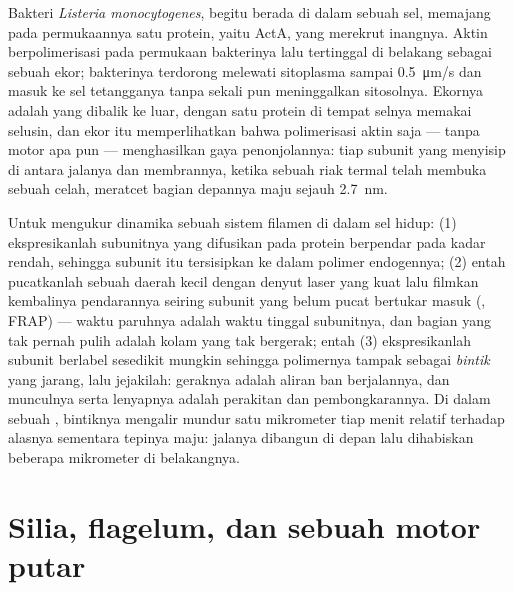\begin{example}\label{ex:b3:cytoskeleton-motility:listeria}
Bakteri \emph{Listeria monocytogenes}, begitu berada di dalam sebuah sel,
memajang pada permukaannya satu protein, yaitu ActA, yang merekrut  inangnya. Aktin berpolimerisasi pada permukaan bakterinya lalu
tertinggal di belakang sebagai sebuah ekor; bakterinya terdorong melewati
sitoplasma sampai \qty{0.5}{\micro m/s} dan masuk ke sel tetangganya tanpa
sekali pun meninggalkan sitosolnya. Ekornya adalah  yang dibalik ke
luar, dengan satu protein di tempat selnya memakai selusin, dan ekor itu
memperlihatkan bahwa polimerisasi aktin saja --- tanpa motor apa pun ---
menghasilkan gaya penonjolannya: tiap subunit yang menyisip di antara jalanya
dan membrannya, ketika sebuah riak termal telah membuka sebuah celah,
meratcet bagian depannya maju sejauh \qty{2.7}{nm}.
\end{example}

\begin{method}\label{met:b3:cytoskeleton-motility:frap}
Untuk mengukur dinamika sebuah sistem filamen di dalam sel hidup: (1)
ekspresikanlah subunitnya yang difusikan pada protein berpendar pada kadar
rendah, sehingga subunit itu tersisipkan ke dalam polimer endogennya; (2)
entah pucatkanlah sebuah daerah kecil dengan denyut laser yang kuat lalu
filmkan kembalinya pendarannya seiring subunit yang belum pucat bertukar masuk
(\emph{}, FRAP) --- waktu paruhnya
adalah waktu tinggal subunitnya, dan bagian yang tak pernah pulih adalah kolam
yang tak bergerak; entah (3) ekspresikanlah subunit berlabel sesedikit mungkin
sehingga polimernya tampak sebagai \emph{bintik} yang jarang, lalu jejakilah:
geraknya adalah aliran ban berjalannya, dan munculnya serta lenyapnya adalah
perakitan dan pembongkarannya. Di dalam sebuah , bintiknya mengalir
mundur satu mikrometer tiap menit relatif terhadap alasnya sementara tepinya
maju: jalanya dibangun di depan lalu dihabiskan beberapa mikrometer di
belakangnya.
\end{method}

\section{Silia, flagelum, dan sebuah motor putar}

